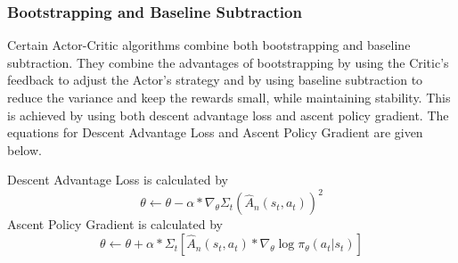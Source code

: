 \documentclass{article}
\begin{document}
\subsubsection{Bootstrapping and Baseline Subtraction}
Certain Actor-Critic algorithms combine both bootstrapping and baseline subtraction. They combine the advantages of bootstrapping by using the Critic's feedback to adjust the Actor's strategy and by using baseline subtraction to reduce the variance and keep the rewards small, while maintaining stability. This is achieved by using both descent advantage loss and ascent policy gradient.  
The equations for Descent Advantage Loss and Ascent Policy Gradient are given below. 
\par Descent Advantage Loss is calculated by 
\begin{equation*}
\theta \leftarrow \theta - \alpha * \nabla_\theta\Sigma_t(\hat{A}_n(s_t,a_t))^2
\end{equation*}
Ascent Policy Gradient is calculated by 
\begin{equation*}
\theta \leftarrow \theta + \alpha * \Sigma_t[\hat{A}_n(s_t,a_t)*\nabla_\theta\log\pi_\theta(a_t|s_t)]
\end{equation*}
\end{document}
